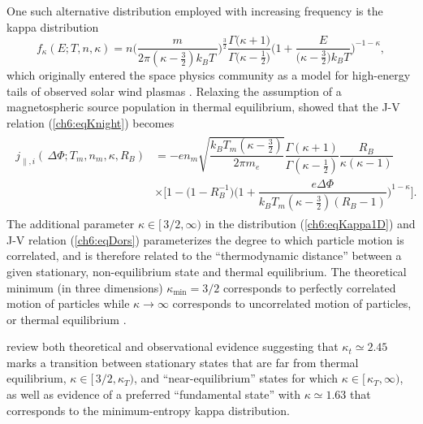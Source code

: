   One such alternative distribution employed with increasing frequency is the
  kappa distribution \citep{Livadiotis2013}
    \begin{equation} \label{ch6:eqKappa1D} f_{\kappa}(E; T, n, \kappa) = n \Bigg
      ( \dfrac{m}{2 \pi (\kappa - \frac{3}{2}) k_{B} T \, } \Bigg
      )^{\frac{3}{2}} \dfrac{\Gamma \big ( \kappa + 1 \big ) }{\Gamma \big (
        \kappa - \frac{1}{2} \big ) } \Bigg ( 1 + \dfrac{E}{ \big ( \kappa -
        \frac{3}{2} \big ) k_B T } \Bigg )^{-1 - \kappa},
    \end{equation}
  which originally entered the space physics community as a model for
  high-energy tails of observed solar wind plasmas
  \citep{Vasyliunas1968}. Relaxing the assumption of a magnetospheric source
  population in thermal equilibrium, \citet{Dors1999} showed that the J-V
  relation (\ref{ch6:eqKnight}) becomes
    \begin{align}
      \label{ch6:eqDors}
      \begin{array}{ll}
        j_{\parallel,i} ( \, \Delta \Phi ; T_m, n_m, \kappa, R_B ) &= - e n_m \sqrt{ \dfrac{ k_B T_m (\kappa -
            \frac{3}{2})}{ 2 \pi m_e}} \dfrac{\Gamma (\kappa + 1)}{\Gamma (\kappa - \frac{1}{2})} \dfrac{R_B}{\kappa (\kappa - 1)} \\
        &\times \Bigg[1 - \Big(1 - R_B^{-1} \Big) \Bigg(1+\dfrac{e \Delta \Phi}{ k_B
          T_m (\kappa - \frac{3}{2})(R_B - 1)} \Bigg)^{1-\kappa} \Bigg].
      \end{array}
    \end{align}
  The additional parameter $\kappa \in [ \, 3/2, \infty )$ in the distribution
  (\ref{ch6:eqKappa1D}) and J-V relation (\ref{ch6:eqDors}) parameterizes the
  degree to which particle motion is correlated, and is therefore related to
  the ``thermodynamic distance'' between a given stationary, non-equilibrium
  state and thermal equilibrium. The theoretical minimum (in three dimensions)
  $\kappa_{\textrm{min}} = 3/2$ corresponds to perfectly correlated motion of
  particles while $\kappa \rightarrow \infty$ corresponds to uncorrelated
  motion of particles, or thermal equilibrium
  \citep{Livadiotis2010,Livadiotis2011,Livadiotis2013}. 

  \citet{Livadiotis2010} review both theoretical and observational evidence
  suggesting that $\kappa_t \simeq 2.45$ marks a transition between stationary
  states that are far from thermal equilibrium, $\kappa \in [ \, 3/2, \kappa_T
  )$, and ``near-equilibrium'' states for which $\kappa \in [ \, \kappa_T,
  \infty )$, as well as evidence of a preferred ``fundamental state'' with
  $\kappa \simeq 1.63$ that corresponds to the minimum-entropy kappa
  distribution.

